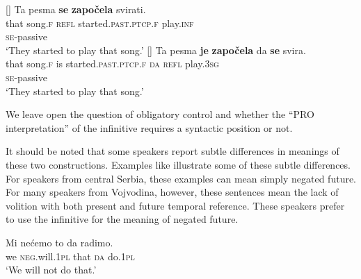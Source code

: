 \documentclass[output=paper,
modfonts,
newtxmath,
hidelinks,
]{langscibook}
\begin{document}
\ea \label{ex16}
	[]{ \label{ex16a2}
		 \gll Ta pesma \textbf{se} \textbf{započela} svirati.\\
         	  that song.\textsc{f} \textsc{refl} started.\textsc{past.ptcp.f} play.\textsc{inf}\\\hfill\textsc{se}-passive\\
		\glt `They started to play that song.'
	}
	[]{ \label{ex16b2}
		\gll Ta pesma \textbf{je} \textbf{započela} da \textbf{se} svira.\\
        	 that song.\textsc{f} is started.\textsc{past.ptcp.f} \textsc{da} \textsc{refl} play.\textsc{3sg}\\\hfill\textsc{se}-passive\\
		\glt `They started to play that song.'
	}
	\z
\z

\noindent We leave open the question of obligatory control and whether the ``PRO interpretation'' of the infinitive requires a syntactic position or not. 

It should be noted that some speakers report subtle differences in meanings of these two constructions. Examples like  illustrate some of these subtle differences. For speakers from central Serbia, these examples can mean simply negated future. For many speakers from Vojvodina, however, these sentences mean the lack of volition with both present and future temporal reference. These speakers prefer to use the infinitive for the meaning of negated future.

\ea \label{ex17}
\gll Mi nećemo to da radimo.\\
     we \textsc{neg.}will.\textsc{1pl} that \textsc{da} do.\textsc{1pl}\\
\glt `We will not do that.'
\z
\end{document}
